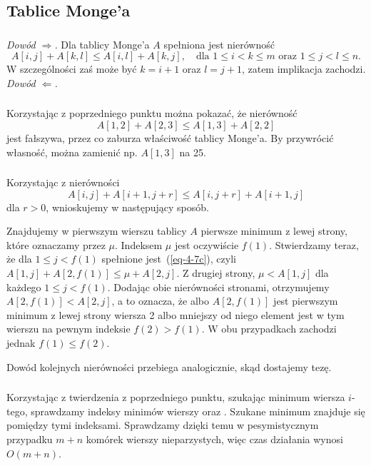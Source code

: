 \subsection{Tablice Monge'a} %

\subsubsection{} %
\noindent\emph{Dowód $\Rightarrow$.} Dla tablicy Monge'a $A$ spełniona jest nierówność
\[
	A[i,j]+A[k,l] \le A[i,l]+A[k,j], \quad\text{dla $1\le i<k\le m$ oraz $1\le j<l\le n$}.
\]
W szczególności zaś może być $k=i+1$ oraz $l=j+1$, zatem implikacja zachodzi.\\

\noindent\emph{Dowód $\Leftarrow$.}

\subsubsection{} %
Korzystając z poprzedniego punktu można pokazać, że nierówność
\[
	A[1,2]+A[2,3] \le A[1,3]+A[2,2]
\]
jest fałszywa, przez co zaburza właściwość tablicy Monge'a. By przywrócić własność, można zamienić np. $A[1,3]$ na 25.

\subsubsection{} %
Korzystając z nierówności
\begin{equation}
	A[i,j]+A[i+1,j+r] \le A[i,j+r]+A[i+1,j]\label{eq-4-7c}
\end{equation}
dla $r>0$, wnioskujemy w następujący sposób.

Znajdujemy w pierwszym wierszu tablicy $A$ pierwsze minimum z lewej strony, które oznaczamy przez $\mu$. Indeksem $\mu$ jest oczywiście $f(1)$. Stwierdzamy teraz, że dla $1\le j<f(1)$ spełnione jest~(\ref{eq-4-7c}), czyli $A[1,j]+A[2,f(1)]\le\mu+A[2,j]$. Z drugiej strony, $\mu<A[1,j]$ dla każdego $1\le j<f(1)$. Dodając obie nierówności stronami, otrzymujemy $A[2,f(1)]<A[2,j]$, a to oznacza, że albo $A[2,f(1)]$ jest pierwszym minimum z lewej strony wiersza 2 albo mniejszy od niego element jest w tym wierszu na pewnym indeksie $f(2)>f(1)$. W obu przypadkach zachodzi jednak $f(1)\le f(2)$.

Dowód kolejnych nierówności przebiega analogicznie, skąd dostajemy tezę.

\subsubsection{} %
Korzystając z twierdzenia z poprzedniego punktu, szukając minimum wiersza $i$-tego, sprawdzamy indeksy minimów wierszy  oraz . Szukane minimum znajduje się pomiędzy tymi indeksami. Sprawdzamy dzięki temu w pesymistycznym przypadku $m+n$ komórek wierszy nieparzystych, więc czas działania wynosi $O(m+n)$.

